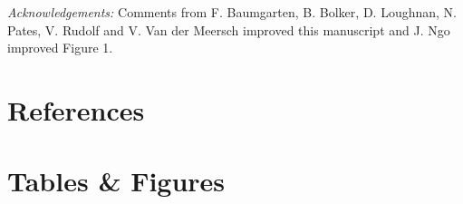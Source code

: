 \documentclass[11pt]{article}
\begin{document}

\emph{Acknowledgements:} Comments from F. Baumgarten, B. Bolker, D. Loughnan, N. Pates, V. Rudolf and V. Van der Meersch improved this manuscript and J. Ngo improved Figure 1. %

\newpage
\section*{References}
\vspace{-5ex}


\clearpage

\section*{Tables \& Figures}
\end{document}
